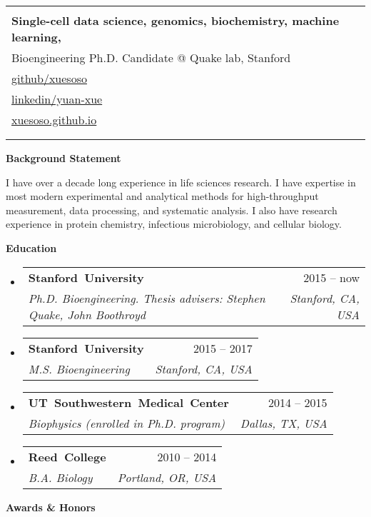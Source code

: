 \documentclass[letterpaper,12pt]{article}[leftmargin=*]
\makeatletter
\def \fullname {Yuan Xue (Soso)}
\def \subtitle {Single-cell data science, genomics, biochemistry, machine learning, \faLinux}
\def \subsubtitle {Bioengineering Ph.D. Candidate @ Quake lab, Stanford}
\def \linkedinicon {\faLinkedin}
\def \linkedinlink {https://linkedin.com/in/yuan-xue-8b1b254a/}
\def \linkedintext {linkedin/yuan-xue}
\def \emailicon {\faEnvelope}
\def \emaillink {mailto:yuanxue@stanford.edu}
\def \emailtext {yuanxue@stanford.edu}
\def \githubicon {\faGithub}
\def \githublink {https://github.com/xuesoso}
\def \githubtext {github/xuesoso}
\def \websiteicon {\faGlobe}
\def \websitelink {https://xuesoso.github.io}
\def \websitetext {xuesoso.github.io}
\def \headertype {\singlecol} %
\def \entryspacing {-0pt}
\def \linkedin {\linkedinicon \hspace{3pt}\href{\linkedinlink}{\linkedintext}}
\def \email {\emailicon \hspace{3pt}\href{\emaillink}{\emailtext}}
\def \github {\githubicon \hspace{3pt}\href{\githublink}{\githubtext}}
\def \website {\websiteicon \hspace{3pt}\href{\websitelink}{\websitetext}}
\renewcommand{\section}[2]{\vspace{5pt}
  \colorbox{secondary}{\color{white}\raggedbottom\normalsize\textbf{{#1}{\hspace{7pt}#2}}}
}
\newcommand{\resumeEntryStart}{\begin{itemize}[leftmargin=2.5mm]}
\newcommand{\resumeEntryEnd}{\end{itemize}\vspace{\entryspacing}}
\newcommand{\resumeEntryTSDL}[4]{
  \vspace{-1pt}\item[]
    \begin{tabularx}{0.97\textwidth}{X@{\hspace{40pt}}r}
      \mbox{\textbf{\color{primary}#1}} & {\firabook\color{accent}\small#2} \\
      \textit{\color{accent}\small#3} & \textit{\color{accent}\small#4} \\
    \end{tabularx}\vspace{-8pt}
}
\newcommand{\doublecol}[6]{
  \begin{tabularx}{\textwidth}{Xr}
    {
      \begin{tabular}[c]{l}
        \fontsize{35}{45}\selectfont{\color{primary}{{\textbf{\fullname}}}} \\
        {\textbf{\subtitle}} \\ {\subsubtitle} %
      \end{tabular}
    } & {
      \begin{tabular}[c]{l@{\hspace{1.5em}}l}
        {\small#4} & {\small#1} \\
        {\small#5} & {\small#2} \\
        {\small#6} & {\small#3}
      \end{tabular}
    }
  \end{tabularx}
}
\newcommand{\singlecol}[6]{
  \begin{tabularx}{\textwidth}{Xr}
    {
      \begin{tabular}[b]{l}
        \fontsize{35}{45}\selectfont{\color{primary}{{\textbf{\fullname}}}} \\
          {\textbf{\subtitle}} \\ {\subsubtitle} %
      \end{tabular}
    } & {
      \begin{tabular}[c]{l}
        {\small#1} \\
        {\small#2} \\
        {\small#3} \\
        {\small#4} \\
        {\small#5} \\
        {\small#6}
      \end{tabular}
    }
  \end{tabularx}
}
\makeatother
\begin{document}


\headertype{\email}{\github}{\linkedin}{\website}{}{} %
\vspace{-30pt} %

\section{\faImage}{Background Statement}

\begin{flushleft}
I have over a decade long experience in life sciences research. I have expertise in most modern experimental and analytical methods for high-throughput measurement, data processing, and systematic analysis. I also have research experience in protein chemistry, infectious microbiology, and cellular biology.
\end{flushleft}

\section{\faGraduationCap}{Education}

  \resumeEntryStart
    \resumeEntryTSDL
      {Stanford University}{2015 -- now}
      {Ph.D. Bioengineering. Thesis advisers: Stephen Quake, John Boothroyd}{Stanford, CA, USA}
    \resumeEntryTSDL
      {Stanford University}{2015 -- 2017}
      {M.S. Bioengineering}{Stanford, CA, USA}
    \resumeEntryTSDL
      {UT Southwestern Medical Center}{2014 -- 2015}
      {Biophysics (enrolled in Ph.D. program)}{Dallas, TX, USA}
    \resumeEntryTSDL
      {Reed College}{2010 -- 2014}
      {B.A. Biology}{Portland, OR, USA}
  \resumeEntryEnd

\section{\faTrophy}{Awards \& Honors}
\end{document}
